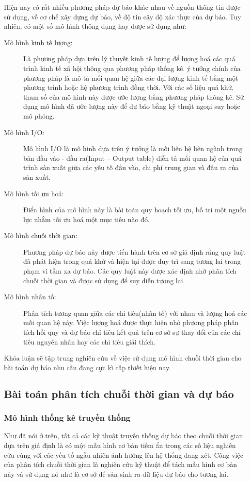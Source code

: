 Hiện nay có rất nhiều phương pháp dự báo khác nhau về nguồn thông tin được sử dụng, về cơ chế xây dựng dự báo, về độ tin cậy độ xác thực của dự báo. Tuy nhiên, có một số mô hình thông dụng hay được sử dụng \citep{efin} như:
\begin{description}
\item[Mô hình kinh tế lượng:] Là phương pháp dựa trên lý thuyết kinh tế lượng để lượng hoá các quá trình kinh tế xã hội thông qua phương pháp thống kê. ý tưởng chính của phương pháp là mô tả mối quan hệ giữa các đại lượng kinh tế bằng một phương trình hoặc hệ phương trình đồng thời. Với các số liệu quá khứ, tham số của mô hình này được ước lượng bằng phương pháp thông kê. Sử dụng mô hình đã ước lượng này để dự báo bằng kỹ thuật ngoại suy hoặc mô phỏng.
\item [Mô hình I/O:] Mô hình I/O là mô hình dựa trên ý tưởng là mối liên hệ liên ngành trong bản đầu vào - đầu ra(Input – Output table) diễn tả mối quan hệ của quá trình sản xuất giữa các yếu tố đầu vào, chi phí trung gian và đầu ra của sản xuất.
\item[Mô hình tối ưu hoá:] Điển hình của mô hình này là bài toán quy hoạch tối ưu, bố trí một nguồn lực nhằm tối ưu hoá một mục tiêu nào đó.
\item[Mô hình chuỗi thời gian:] Phương pháp dự báo này được tiến hành trên cơ sở giả định rằng quy luật đã phát hiện trong quá khứ và hiện tại được duy trì sang tương lai trong phạm vi tầm xa dự báo. Các quy luật này được xác định nhờ phân tích chuỗi thời gian và được sử dụng để suy diễn tương lai.
\item [Mô hình nhân tố:] Phân tích tương quan giữa các chỉ tiêu(nhân tố) với nhau và lượng hoá các mối quan hệ này. Việc lượng hoá được thực hiện nhờ phương pháp phân tích hồi quy và dự báo chỉ tiêu kết quả trên cơ sở sự thay đổi của các chỉ tiêu nguyên nhân hay các chỉ tiêu giải thích.
\end{description}
Khóa luận sẽ tập trung nghiên cứu về việc sử dụng mô hình chuỗi thời gian cho bài toán dự báo nhu cầu đang cực kì cấp thiết hiện nay.
\subsection{Bài toán phân tích chuỗi thời gian và dự báo}
\subsubsection{Mô hình thống kê truyền thống}
Như đã nói ở trên, tất cả các kỹ thuật truyền thống dự báo theo chuỗi thời gian dựa trên giả định là có một mẫu hình cơ bản tiềm ẩn trong các số liệu nghiên cứu cùng với các yếu tố ngẫu nhiên ảnh hưởng lên hệ thống đang xét. Công việc của phân tích chuỗi thời gian là nghiên cứu kỹ thuật để tách mẫu hình cơ bản này và sử dụng nó như là cơ sở để sản sinh ra dữ liệu dự báo cho tương lai.

